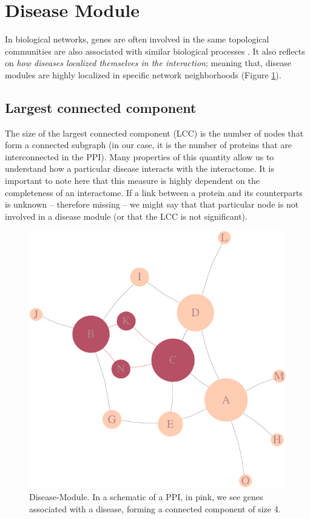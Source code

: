 \documentclass[
]{book}
\begin{document}
\hypertarget{diseasemodule}{%
\section{Disease Module}\label{diseasemodule}}

In biological networks, genes are often involved in the same topological communities are also associated with similar biological processes \citep{Ahn2010}. It also reflects on \emph{how diseases localized themselves in the interaction}; meaning that, disease modules are highly localized in specific network neighborhoods \citep{Menche2015} (Figure \ref{fig:diseasemodule}).

\hypertarget{largest-connected-component}{%
\subsection{Largest connected component}\label{largest-connected-component}}

The size of the largest connected component (LCC) is the number of nodes that form a connected subgraph (in our case, it is the number of proteins that are interconnected in the PPI). Many properties of this quantity allow us to understand how a particular disease interacts with the interactome. It is important to note here that this measure is highly dependent on the completeness of an interactome. If a link between a protein and its counterparts is unknown -- therefore missing -- we might say that that particular node is not involved in a disease module (or that the LCC is not significant).

\begin{figure}
\centering
\includegraphics{NetMed_files/figure-latex/diseasemodule-1.pdf}
\caption{\label{fig:diseasemodule}Disease-Module. In a schematic of a PPI, in pink, we see genes associated with a disease, forming a connected component of size 4.}
\end{figure}
\end{document}
